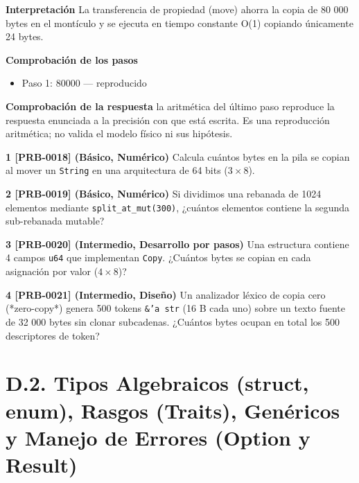 \documentclass{book}
\begin{document}
\begin{tcolorbox}[title={Problema resuelto}, studiumworked, breakable]
\noindent\textbf{Interpretación}
La transferencia de propiedad (move) ahorra la copia de 80 000 bytes en el montículo y se ejecuta en tiempo constante O(1) copiando únicamente 24 bytes.

\noindent\textbf{Comprobación de los pasos}
\begin{itemize}
\item Paso 1: $80000$ — reproducido
\end{itemize}

\noindent\textbf{Comprobación de la respuesta} la aritmética del último paso reproduce la respuesta enunciada a la precisión con que está escrita. Es una reproducción aritmética; no valida el modelo físico ni sus hipótesis.
\end{tcolorbox}

\begin{tcolorbox}[title={Ejercicios}, studiumworked, breakable]

\noindent\textbf{1 [PRB-0018] (Básico, Numérico)}
Calcula cuántos bytes en la pila se copian al mover un \texttt{String} en una arquitectura de 64 bits (\(3 \times 8\)).

\noindent\textbf{2 [PRB-0019] (Básico, Numérico)}
Si dividimos una rebanada de 1024 elementos mediante \texttt{split\_at\_mut(300)}, ¿cuántos elementos contiene la segunda sub-rebanada mutable?

\noindent\textbf{3 [PRB-0020] (Intermedio, Desarrollo por pasos)}
Una estructura contiene 4 campos \texttt{u64} que implementan \texttt{Copy}. ¿Cuántos bytes se copian en cada asignación por valor (\(4 \times 8\))?

\noindent\textbf{4 [PRB-0021] (Intermedio, Diseño)}
Un analizador léxico de copia cero (*zero-copy*) genera 500 tokens \texttt{\&'a str} (16 B cada uno) sobre un texto fuente de 32 000 bytes sin clonar subcadenas. ¿Cuántos bytes ocupan en total los 500 descriptores de token?
\end{tcolorbox}

\chapter{D.2. Tipos Algebraicos (struct, enum), Rasgos (Traits), Genéricos y Manejo de Errores (Option y Result)}
\label{chap:cap04-tipos-algebraicos-traits-genericos-errores}
\end{document}
